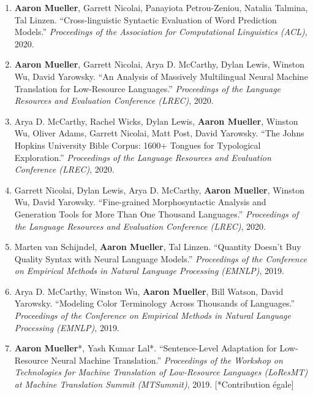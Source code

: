 \documentclass[10pt]{article}
\begin{document}
\begin{enumerate}[leftmargin=*, topsep=0pt, itemsep=-1ex, partopsep=0ex, parsep=1ex]
	\item \textbf{Aaron Mueller}, Garrett Nicolai, Panayiota Petrou-Zeniou, Natalia Talmina, Tal Linzen. ``Cross-linguistic Syntactic Evaluation of Word Prediction Models.'' \emph{Proceedings of the Association for Computational Linguistics (ACL)}, 2020.

	\item \textbf{Aaron Mueller}, Garrett Nicolai, Arya D. McCarthy, Dylan Lewis, Winston Wu, David Yarowsky. ``An Analysis of Massively Multilingual Neural Machine Translation for Low-Resource Languages.'' \emph{Proceedings of the Language Resources and Evaluation Conference (LREC)}, 2020.

	\item Arya D. McCarthy, Rachel Wicks, Dylan Lewis, \textbf{Aaron Mueller}, Winston Wu, Oliver Adams, Garrett Nicolai, Matt Post, David Yarowsky. ``The Johns Hopkins University Bible Corpus: 1600+ Tongues for Typological Exploration.'' \emph{Proceedings of the Language Resources and Evaluation Conference (LREC)}, 2020.

	\item Garrett Nicolai, Dylan Lewis, Arya D. McCarthy, \textbf{Aaron Mueller}, Winston Wu, David Yarowsky. ``Fine-grained Morphosyntactic Analysis and Generation Tools for More Than One Thousand Languages.'' \emph{Proceedings of the Language Resources and Evaluation Conference (LREC)}, 2020.

	\item Marten van Schijndel, \textbf{Aaron Mueller}, Tal Linzen. ``Quantity Doesn't Buy Quality Syntax with Neural Language Models.'' \emph{Proceedings of the Conference on Empirical Methods in Natural Language Processing (EMNLP)}, 2019.

	\item Arya D. McCarthy, Winston Wu, \textbf{Aaron Mueller}, Bill Watson, David Yarowsky. ``Modeling Color Terminology Across Thousands of Languages.'' \emph{Proceedings of the Conference on Empirical Methods in Natural Language Processing (EMNLP)}, 2019.

	\item \textbf{Aaron Mueller}*, Yash Kumar Lal*. ``Sentence-Level Adaptation for Low-Resource Neural Machine Translation.'' \emph{Proceedings of the Workshop on Technologies for Machine Translation of Low-Resource Languages (LoResMT) at Machine Translation Summit (MTSummit)}, 2019. [*Contribution égale]
	\end{enumerate}
\end{document}
